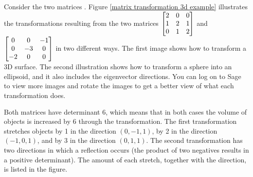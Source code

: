 \begin{example}\label{3d transformation example}
Consider the two matrices 
. Figure \ref{matrix transformation 3d example} illustrates the transformations resulting from the two matrices $\begin{bmatrix}  2 & 0 & 0 \\ 1 & 2 & 1 \\ 0 & 1 & 2 \end{bmatrix}$
and 
$\begin{bmatrix}  0 & 0 & -1 \\ 0 & -3 & 0 \\ -2 & 0 & 0 \end{bmatrix}$ in two different ways.  The first image shows how to transform a 3D surface.  The second illustration shows how to transform a sphere into an ellipsoid, and it also includes the eigenvector directions. You can log on to Sage to view more images and rotate the images to get a better view of what each transformation does. 

Both matrices have determinant 6, which means that in both cases the volume of objects is increased by 6 through the transformation.  The first transformation stretches objects by 1 in the direction $(0,-1,1)$, by 2 in the direction $(-1,0,1)$, and by 3 in the direction $(0,1,1)$.  The second transformation has two directions in which a reflection occurs (the product of two negatives results in a positive determinant).  The amount of each stretch, together with the direction, is listed in the figure.



\end{example}
